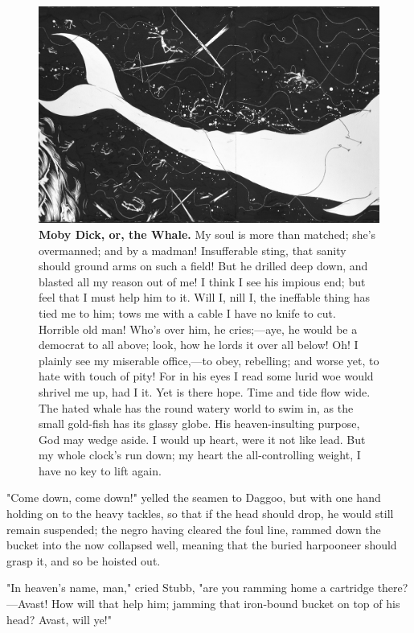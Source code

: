 \documentclass{article}
\begin{document}
\begin{figure}[!htp]
  \begin{center}
      \includegraphics{MOBYDICK}
    \caption{
        \textbf{Moby Dick, or, the Whale.}
My soul is more than matched; she's overmanned; and by a madman! Insufferable sting, that sanity should ground arms on such a field! But he drilled deep down, and blasted all my reason out of me! I think I see his impious end; but feel that I must help him to it. Will I, nill I, the ineffable thing has tied me to him; tows me with a cable I have no knife to cut. Horrible old man! Who's over him, he cries;—aye, he would be a democrat to all above; look, how he lords it over all below! Oh! I plainly see my miserable office,—to obey, rebelling; and worse yet, to hate with touch of pity! For in his eyes I read some lurid woe would shrivel me up, had I it. Yet is there hope. Time and tide flow wide. The hated whale has the round watery world to swim in, as the small gold-fish has its glassy globe. His heaven-insulting purpose, God may wedge aside. I would up heart, were it not like lead. But my whole clock's run down; my heart the all-controlling weight, I have no key to lift again. 
    }
  \end{center}
\end{figure}

"Come down, come down!" yelled the seamen to Daggoo, but with one hand holding on to the heavy tackles, so that if the head should drop, he would still remain suspended; the negro having cleared the foul line, rammed down the bucket into the now collapsed well, meaning that the buried harpooneer should grasp it, and so be hoisted out.

"In heaven's name, man," cried Stubb, "are you ramming home a cartridge there?—Avast! How will that help him; jamming that iron-bound bucket on top of his head? Avast, will ye!"
\end{document}

